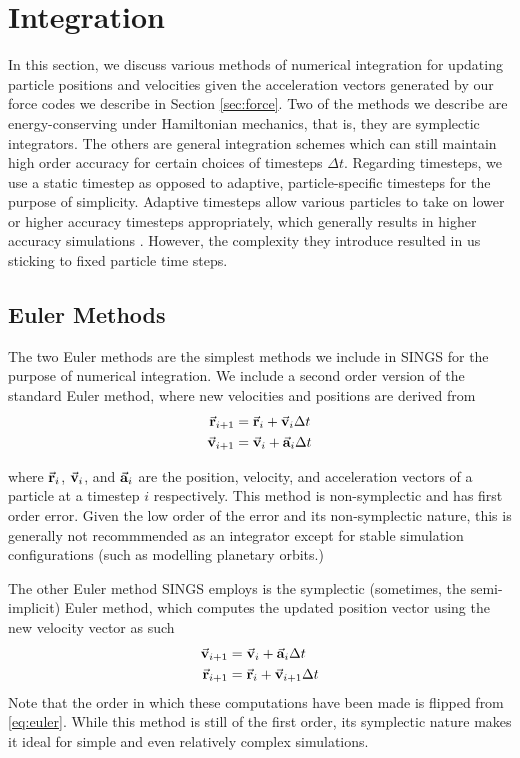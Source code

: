 \documentclass[12pt, twoside, letterpaper]{article}
\begin{document}
\section{Integration} \label{sec:integration}
In this section, we discuss various methods of numerical integration for updating particle positions and velocities given the acceleration vectors generated by our force codes we describe in Section \ref{sec:force}. Two of the methods we describe are energy-conserving under Hamiltonian mechanics, that is, they are symplectic integrators. The others are general integration schemes which can still maintain high order accuracy for certain choices of timesteps $\Delta t$. Regarding timesteps, we use a static timestep as opposed to adaptive, particle-specific timesteps for the purpose of simplicity. Adaptive timesteps allow various particles to take on lower or higher accuracy timesteps appropriately, which generally results in higher accuracy simulations \citep{aarseth1963dynamical}. However, the complexity they introduce resulted in us sticking to fixed particle time steps.

\subsection{Euler Methods} \label{subsec:euler}
The two Euler methods are the simplest methods we include in SINGS for the purpose of numerical integration. We include a second order version of the standard Euler method, where new velocities and positions are derived from
\begin{subequations} \label{eq:euler}
	\begin{align}
		\va{r}_{i+1} & = \va{r}_i + \va{v}_i \Delta t \\
		\va{v}_{i+1} & = \va{v}_i + \va{a}_i \Delta t
	\end{align}
\end{subequations}

\noindent where $\va{r}_{i}$, $\va{v}_i$, and $\va{a}_i$ are the position, velocity, and acceleration vectors of a particle at a timestep $i$ respectively. This method is non-symplectic and has first order error. Given the low order of the error and its non-symplectic nature, this is generally not recommmended as an integrator except for stable simulation configurations (such as modelling planetary orbits.)

The other Euler method SINGS employs is the symplectic (sometimes, the semi-implicit) Euler method, which computes the updated position vector using the new velocity vector as such
\begin{subequations} \label{eq:seuler}
	\begin{align}
		\va{v}_{i+1} & = \va{v}_i + \va{a}_i \Delta t \\
		\va{r}_{i+1} & = \va{r}_i + \va{v}_{i+1} \Delta t
	\end{align}
\end{subequations}
\noindent Note that the order in which these computations have been made is flipped from \eqref{eq:euler}. While this method is still of the first order, its symplectic nature makes it ideal for simple and even relatively complex simulations.
\end{document}
